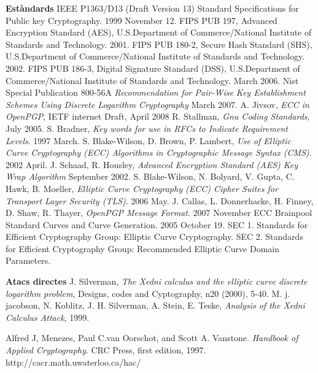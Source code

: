 \documentclass[12pt,twoside,catalan,a4paper]{book}%
\numberwithin{figure}{section}		%
\theoremstyle{definition}   			%
\theoremstyle{saltolinea}   			%
\begin{document}
\begin{thebibliography}{1}
\vspace{5mm}
 {\large\bf Est\`andards}
IEEE P1363/D13 (Draft Version 13) Standard Specifications for Public key Cryptography. 1999 November 12.
 FIPS PUB 197, Advanced Encryption Standard (AES), U.S.Department of Commerce/National Institute of Standards and Technology. 2001.
FIPS PUB 180-2, Secure Hash Standard (SHS), U.S.Department of Commerce/National Institute of Standards and Technology. 2002.
FIPS PUB 186-3, Digital Signature Standard (DSS), U.S.Department of Commerce/National Institute of Standards and Technology. March 2006.
 Nist Special Publication 800-56A \emph{Recommendation for Pair-Wise Key Establishment Schemes Using Discrete Logarithm Cryptography} March 2007.
 A. Jivsov, \textit{ECC in OpenPGP}, IETF internet Draft, April 2008
 R. Stallman, \textit{Gnu Coding Standards}, July 2005.
 S. Bradner, \textit{Key words for use in RFCs to Indicate Requirement Levels}. 1997 March.
 S. Blake-Wilson, D. Brown, P. Lambert, \textit{Use of Elliptic Curve Cryptography (ECC) Algorithms in Cryptographic Message Syntax (CMS)}. 2002 April.
 J. Schaad, R. Housley, \textit{ Advanced Encryption Standard (AES) Key Wrap Algorithm} September 2002.
 S. Blake-Wilson, N. Bolyard, V. Gupta, C. Hawk, B. Moeller, \textit{Elliptic Curve Cryptography (ECC) Cipher Suites for Transport Layer Security (TLS)}. 2006 May.
 J. Callas, L. Donnerhacke, H. Finney, D. Shaw, R. Thayer, \textit{OpenPGP Message Format}. 2007 November
 ECC Brainpool Standard Curves and Curve Generation. 2005 October 19.
 SEC 1. Standards for Efficient Cryptography Group: Elliptic Curve Cryptography.
 SEC 2. Standards for Efficient Cryptography Group: Recommended Elliptic Curve Domain Parameters.

\vspace{5mm}
 {\large\bf Atacs directes}
J. Silverman, \textit{The Xedni calculus and the elliptic curve discrete logarithm problem}, Designs, codes and Cyptography, n20 (2000), 5-40.
M. j. jacobson, N. Koblitz, J. H. Silverman, A. Stein, E. Teske, \textit{Analysis of the Xedni Calculus Attack}, 1999.

 Alfred J, Menezes, Paul C.van Oorschot, and Scott A. Vanstone. \textit{Handbook of Applied Cryptography}. CRC Press, first edition, 1997. http://cacr.math.uwaterloo.ca/hac/


\end{thebibliography}
\end{document}
